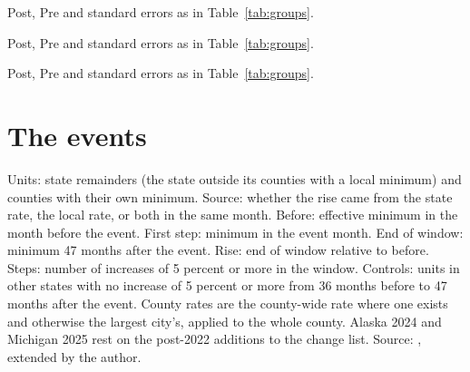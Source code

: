 \documentclass[12pt]{article}
\begin{document}
\begin{table}[H]
\centering
\caption{Effects on school--work status, boys: post-event averages}
\label{tab:groupsmale}
\small

\begin{tablenotes}\footnotesize
\item Post, Pre and standard errors as in Table~\ref{tab:groups}.
\end{tablenotes}
\end{table}

\begin{table}[H]
\centering
\caption{Effects on school--work status, non-Hispanic white teens: post-event averages}
\label{tab:groupswhite}
\small

\begin{tablenotes}\footnotesize
\item Post, Pre and standard errors as in Table~\ref{tab:groups}.
\end{tablenotes}
\end{table}

\begin{table}[H]
\centering
\caption{Effects on school--work status, Black, Hispanic and other non-white teens: post-event averages}
\label{tab:groupsnonwhite}
\small

\begin{tablenotes}\footnotesize
\item Post, Pre and standard errors as in Table~\ref{tab:groups}.
\end{tablenotes}
\end{table}

\clearpage
\section{The events}

\begin{table}[H]
\centering
\caption{The 70 unit events, 2013--2024}
\label{tab:events}
\scriptsize

\begin{tablenotes}\scriptsize
\item Units: state remainders (the state outside its counties with a local minimum) and counties with their own minimum. Source: whether the rise came from the state rate, the local rate, or both in the same month. Before: effective minimum in the month before the event. First step: minimum in the event month. End of window: minimum 47 months after the event. Rise: end of window relative to before. Steps: number of increases of 5 percent or more in the window. Controls: units in other states with no increase of 5 percent or more from 36 months before to 47 months after the event. County rates are the county-wide rate where one exists and otherwise the largest city's, applied to the whole county. Alaska 2024 and Michigan 2025 rest on the post-2022 additions to the change list. Source: \citet{vaghul2016}, extended by the author.
\end{tablenotes}
\end{table}
\end{document}
